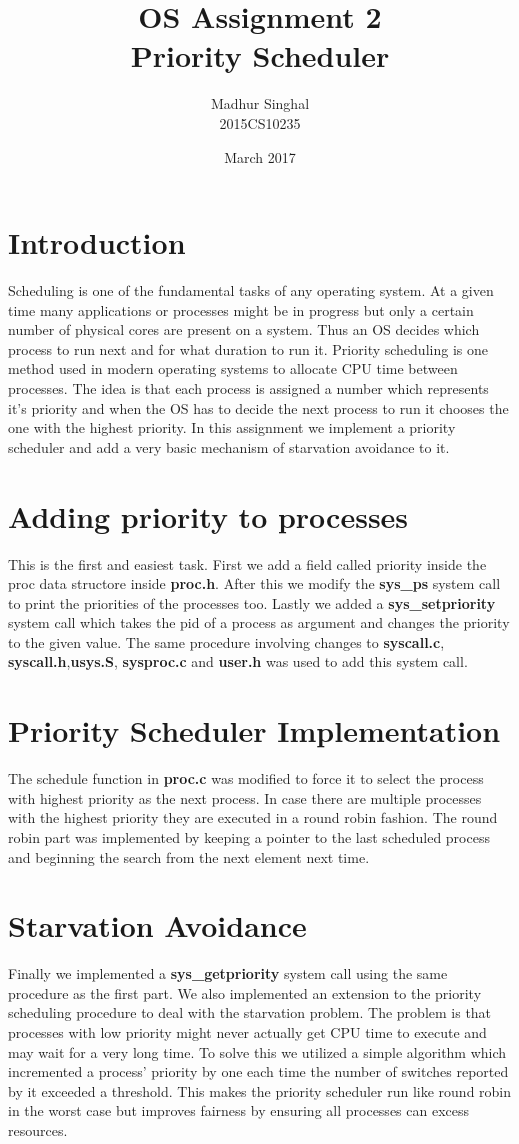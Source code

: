 \documentclass[12pt,a4paper]{article}
\author{Madhur Singhal\\2015CS10235}
\title{OS Assignment 2\\Priority Scheduler}
\date{March 2017}
\begin{document}
\maketitle
\section{Introduction}
Scheduling is one of the fundamental tasks of any operating system. At a given time many applications or processes might be in progress but only a certain number of physical cores are present on a system. Thus an OS decides which process to run next and for what duration to run it. Priority scheduling is one method used in modern operating systems to allocate CPU time between processes. The idea is that each process is assigned a number which represents it's priority and when the OS has to decide the next process to run it chooses the one with the highest priority. In this assignment we implement a priority scheduler and add a very basic mechanism of starvation avoidance to it.\section{Adding priority to processes}
This is the first and easiest task. First we add a field called priority inside the proc data structore inside \textbf{proc.h}. After this we modify the \textbf{sys\_ps} system call to print the priorities of the processes too. Lastly we added a \textbf{sys\_setpriority} system call which takes the pid of a process as argument and changes the priority to the given value. The same procedure involving changes to \textbf{syscall.c}, \textbf{syscall.h},\textbf{usys.S}, \textbf{sysproc.c} and \textbf{user.h} was used to add this system call.
\section{Priority Scheduler Implementation}
The schedule function in \textbf{proc.c} was modified to force it to select the process with highest priority as the next process. In case there are multiple processes with the highest priority they are executed in a round robin fashion. The round robin part was implemented by keeping a pointer to the last scheduled process and beginning the search from the next element next time.
\section{Starvation Avoidance}
Finally we implemented a \textbf{sys\_getpriority} system call using the same procedure as the first part. We also implemented an extension to the priority scheduling procedure to deal with the starvation problem. The problem is that processes with low priority might never actually get CPU time to execute and may wait for a very long time. To solve this we utilized a simple algorithm which incremented a process' priority by one each time the number of switches reported by it exceeded a threshold. This makes the priority scheduler run like round robin in the worst case but improves fairness by ensuring all processes can excess resources.
\end{document}

